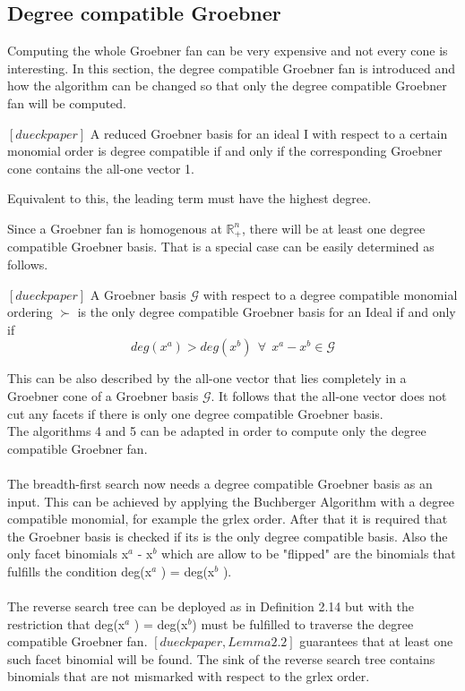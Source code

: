 \subsection{Degree compatible Groebner}
\label{subsec:degreecomp}
Computing the whole Groebner fan can be very expensive and not every cone is interesting.
In this section, the degree compatible Groebner fan is introduced and how the algorithm can
be changed so that only the degree compatible Groebner fan will be computed.\\
\begin{env_definition}
$[dueck paper] $
A reduced Groebner basis for an ideal I with respect to a certain monomial order is
degree compatible if and only if the corresponding Groebner cone contains the all-one vector 1.
\end{env_definition}
Equivalent to this, the leading term must have the highest degree.

Since a Groebner fan is homogenous at $\mathbb{R}^{n}_{+}$, there will be at least one degree compatible Groebner basis.
That is a special case can be easily determined as follows.

\begin{env_definition}
$[dueck paper] $
A Groebner basis $\mathcal{G}$ with respect to a degree compatible monomial ordering $\succ$  is the only degree compatible Groebner basis for an Ideal if and only if
\[ deg(x^{a}) > deg(x^{b})~~ \forall~~ x^{a}-x^{b}\in \mathcal{G} \] 
\end{env_definition}

This can be also described by the all-one vector that lies completely in a Groebner cone of a Groebner basis $\mathcal{G}$.
It follows that the all-one vector does not cut any facets if there is only one degree compatible Groebner basis. \\

The algorithms 4 and 5 can be adapted in order to compute only the degree compatible Groebner fan.\\ \\
The breadth-first search now needs a degree compatible Groebner basis as an input. This can be achieved by applying the Buchberger Algorithm with a degree compatible monomial, for example the grlex order. After that it is required that the Groebner basis is checked if its is the only degree compatible basis. %
Also the only facet binomials x$^{a}$ - x$^{b}$ which are allow to be "flipped" are the binomials that fulfills the condition
deg(x$^{a}$ ) = deg(x$^{b} $ ). \\ \\
The reverse search tree can be deployed as in Definition 2.14 but with the restriction that deg(x$^{a}$ ) = deg(x$^{b}$) must be fulfilled to traverse the degree compatible Groebner fan.
$[dueckpaper, Lemma 2.2]$ guarantees that at least one such facet binomial will be found. 
The sink of the reverse search tree contains binomials that are not mismarked with respect to the grlex order. 

